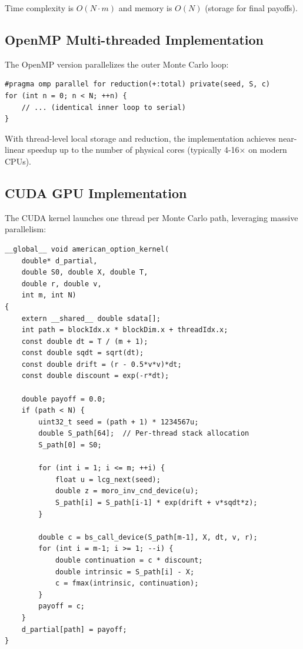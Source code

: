 \documentclass[11pt,a4paper]{article}
\begin{document}
Time complexity is $O(N \cdot m)$ and memory is $O(N)$ (storage for final payoffs).

\subsection{OpenMP Multi-threaded Implementation}

The OpenMP version parallelizes the outer Monte Carlo loop:

\begin{lstlisting}
#pragma omp parallel for reduction(+:total) private(seed, S, c)
for (int n = 0; n < N; ++n) {
    // ... (identical inner loop to serial)
}
\end{lstlisting}

With thread-level local storage and reduction, the implementation achieves near-linear speedup up to the number of physical cores (typically 4-16× on modern CPUs).

\subsection{CUDA GPU Implementation}

The CUDA kernel launches one thread per Monte Carlo path, leveraging massive parallelism:

\begin{lstlisting}
__global__ void american_option_kernel(
    double* d_partial,
    double S0, double X, double T,
    double r, double v,
    int m, int N)
{
    extern __shared__ double sdata[];
    int path = blockIdx.x * blockDim.x + threadIdx.x;
    const double dt = T / (m + 1);
    const double sqdt = sqrt(dt);
    const double drift = (r - 0.5*v*v)*dt;
    const double discount = exp(-r*dt);
    
    double payoff = 0.0;
    if (path < N) {
        uint32_t seed = (path + 1) * 1234567u;
        double S_path[64];  // Per-thread stack allocation
        S_path[0] = S0;
        
        for (int i = 1; i <= m; ++i) {
            float u = lcg_next(seed);
            double z = moro_inv_cnd_device(u);
            S_path[i] = S_path[i-1] * exp(drift + v*sqdt*z);
        }
        
        double c = bs_call_device(S_path[m-1], X, dt, v, r);
        for (int i = m-1; i >= 1; --i) {
            double continuation = c * discount;
            double intrinsic = S_path[i] - X;
            c = fmax(intrinsic, continuation);
        }
        payoff = c;
    }
    d_partial[path] = payoff;
}
\end{lstlisting}
\end{document}
